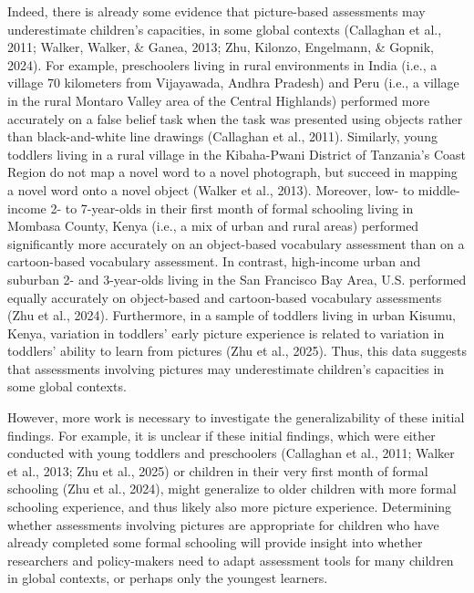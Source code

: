 \documentclass[10pt, letterpaper]{article}
\begin{document}
Indeed, there is already some evidence that picture-based assessments
may underestimate children's capacities, in some global contexts
(Callaghan et al., 2011; Walker, Walker, \& Ganea, 2013; Zhu, Kilonzo,
Engelmann, \& Gopnik, 2024). For example, preschoolers living in rural
environments in India (i.e., a village 70 kilometers from Vijayawada,
Andhra Pradesh) and Peru (i.e., a village in the rural Montaro Valley
area of the Central Highlands) performed more accurately on a false
belief task when the task was presented using objects rather than
black-and-white line drawings (Callaghan et al., 2011). Similarly, young
toddlers living in a rural village in the Kibaha-Pwani District of
Tanzania's Coast Region do not map a novel word to a novel photograph,
but succeed in mapping a novel word onto a novel object (Walker et al.,
2013). Moreover, low- to middle-income 2- to 7-year-olds in their first
month of formal schooling living in Mombasa County, Kenya (i.e., a mix
of urban and rural areas) performed significantly more accurately on an
object-based vocabulary assessment than on a cartoon-based vocabulary
assessment. In contrast, high-income urban and suburban 2- and
3-year-olds living in the San Francisco Bay Area, U.S. performed equally
accurately on object-based and cartoon-based vocabulary assessments (Zhu
et al., 2024). Furthermore, in a sample of toddlers living in urban
Kisumu, Kenya, variation in toddlers' early picture experience is
related to variation in toddlers' ability to learn from pictures (Zhu et
al., 2025). Thus, this data suggests that assessments involving pictures
may underestimate children's capacities in some global contexts.

However, more work is necessary to investigate the generalizability of
these initial findings. For example, it is unclear if these initial
findings, which were either conducted with young toddlers and
preschoolers (Callaghan et al., 2011; Walker et al., 2013; Zhu et al.,
2025) or children in their very first month of formal schooling (Zhu et
al., 2024), might generalize to older children with more formal
schooling experience, and thus likely also more picture experience.
Determining whether assessments involving pictures are appropriate for
children who have already completed some formal schooling will provide
insight into whether researchers and policy-makers need to adapt
assessment tools for many children in global contexts, or perhaps only
the youngest learners.
\end{document}

